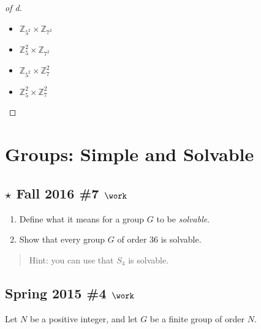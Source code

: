 \begin{solution}
\begin{proof}[of d]
\begin{itemize}
\tightlist
\item
  \({\mathbb{Z}}_{5^2} \times{\mathbb{Z}}_{7^2}\)
\item
  \({\mathbb{Z}}_{5}^2 \times{\mathbb{Z}}_{7^2}\)
\item
  \({\mathbb{Z}}_{5^2} \times{\mathbb{Z}}_{7}^2\)
\item
  \({\mathbb{Z}}_{5}^2 \times{\mathbb{Z}}_{7}^2\)
\end{itemize}

\end{proof}

\end{solution}

\hypertarget{groups-simple-and-solvable}{%
\section{Groups: Simple and Solvable}\label{groups-simple-and-solvable}}

\hypertarget{star-fall-2016-7-work}{%
\subsection{\texorpdfstring{\(\star\) Fall 2016 \#7
\(\work\)}{\textbackslash star Fall 2016 \#7 \textbackslash work}}\label{star-fall-2016-7-work}}

\begin{enumerate}
\def\labelenumi{\alph{enumi}.}
\item
  Define what it means for a group \(G\) to be \emph{solvable}.
\item
  Show that every group \(G\) of order 36 is solvable.
\end{enumerate}

\begin{quote}
Hint: you can use that \(S_4\) is solvable.
\end{quote}

\hypertarget{spring-2015-4-work}{%
\subsection{\texorpdfstring{Spring 2015 \#4
\(\work\)}{Spring 2015 \#4 \textbackslash work}}\label{spring-2015-4-work}}

Let \(N\) be a positive integer, and let \(G\) be a finite group of
order \(N\).

